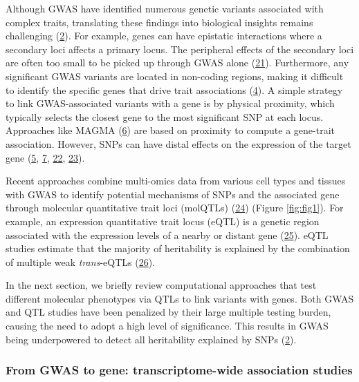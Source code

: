 Although GWAS have identified numerous genetic variants associated with complex traits, translating these findings into biological insights remains challenging (\protect\hyperlink{ref-17B4AigZT}{2}).
For example, genes can have epistatic interactions where a secondary loci affects a primary locus.
The peripheral effects of the secondary loci are often too small to be picked up through GWAS alone (\protect\hyperlink{ref-IrGVpNji}{21}).
Furthermore, any significant GWAS variants are located in non-coding regions, making it difficult to identify the specific genes that drive trait associations (\protect\hyperlink{ref-BqjxxhyF}{4}).
A simple strategy to link GWAS-associated variants with a gene is by physical proximity, which typically selects the closest gene to the most significant SNP at each locus.
Approaches like MAGMA (\protect\hyperlink{ref-19XiXgYmd}{6}) are based on proximity to compute a gene-trait association.
However, SNPs can have distal effects on the expression of the target gene (\protect\hyperlink{ref-9Pr9idng}{5}, \protect\hyperlink{ref-167QL5tMV}{7}, \protect\hyperlink{ref-OBxYzUMh}{22}, \protect\hyperlink{ref-WfdUHVDA}{23}).

Recent approaches combine multi-omics data from various cell types and tissues with GWAS to identify potential mechanisms of SNPs and the associated gene through molecular quantitative trait loci (molQTLs) (\protect\hyperlink{ref-QIEm5ZWK}{24}) (Figure \ref{fig:fig1}).
For example, an expression quantitative trait locus (eQTL) is a genetic region associated with the expression levels of a nearby or distant gene (\protect\hyperlink{ref-1FHKg3JK5}{25}).
eQTL studies estimate that the majority of heritability is explained by the combination of multiple weak \emph{trans}-eQTLs (\protect\hyperlink{ref-sGgkLsyy}{26}).

In the next section, we briefly review computational approaches that test different molecular phenotypes via QTLs to link variants with genes.
Both GWAS and QTL studies have been penalized by their large multiple testing burden, causing the need to adopt a high level of significance.
This results in GWAS being underpowered to detect all heritability explained by SNPs (\protect\hyperlink{ref-17B4AigZT}{2}).

\hypertarget{from-gwas-to-gene-transcriptome-wide-association-studies}{%
\subsubsection{From GWAS to gene: transcriptome-wide association studies}\label{from-gwas-to-gene-transcriptome-wide-association-studies}}

